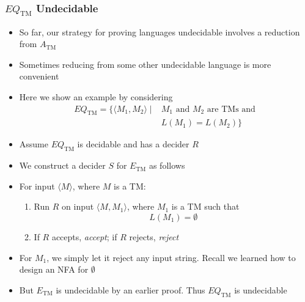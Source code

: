 \begin{frame}[allowframebreaks] \frametitle{$EQ_{\text{TM}}$ Undecidable}
\begin{itemize}
\item So far, our strategy for proving languages undecidable
  involves a reduction from $A_{\text{TM}}$
\item Sometimes reducing from some other undecidable language
  is more convenient
\item Here we show an example by considering
  \begin{equation*}
    \begin{split}
      EQ_{\text{TM}} = \{
      \langle  M_1, M_2 \rangle \mid { }  & M_1 \text{ and } M_2 \text{ are TMs
        and } \\
      & L(M_1) = L(M_2)\}
    \end{split}
  \end{equation*}
\item Assume $EQ_{\text{TM}}$ is decidable and has a decider
  $R$
\item We construct a decider $S$ for $E_{\text{TM}}$ as follows
\item For input $\langle M \rangle$, where $M$ is a TM:
  \begin{enumerate}
  \item Run $R$ on input $\langle M, M_1 \rangle$,
    where $M_1$ is a TM such that
    \begin{equation*}
    L(M_1) = \emptyset
  \end{equation*}
\item If $R$ accepts, {\em accept}; if $R$ rejects, {\em reject}
  \end{enumerate}
\item For $M_1$, we simply let it reject any input string.
  Recall we learned how to design an NFA for $\emptyset$
\item But $E_{\text{TM}}$ is undecidable by an earlier proof.
  Thus $EQ_{\text{TM}}$ is undecidable
\end{itemize}
\end{frame}




